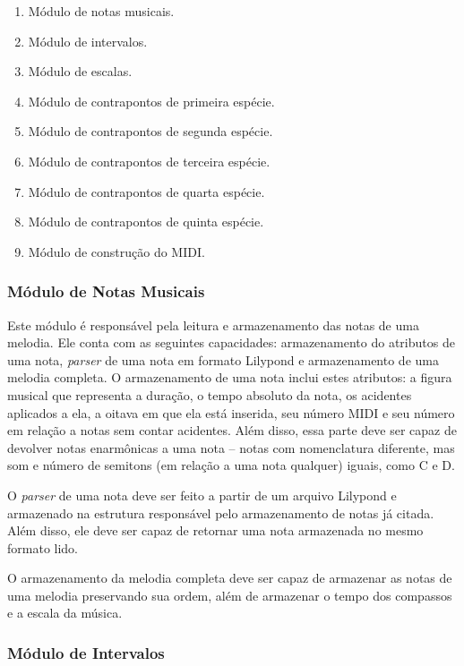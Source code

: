     \begin{enumerate}
      \item Módulo de notas musicais.
      \item Módulo de intervalos.
      \item Módulo de escalas.
      \item Módulo de contrapontos de primeira espécie.
      \item Módulo de contrapontos de segunda espécie.
      \item Módulo de contrapontos de terceira espécie.
      \item Módulo de contrapontos de quarta espécie.
      \item Módulo de contrapontos de quinta espécie.
      \item Módulo de construção do MIDI.
    \end{enumerate}

    \subsubsection[Módulo de Notas Musicais]{Módulo de Notas Musicais}

      Este módulo é responsável pela leitura e armazenamento das notas de uma melodia. Ele conta com as seguintes capacidades: armazenamento do atributos de uma nota, \textit{parser} de uma nota em formato Lilypond e armazenamento de uma melodia completa. O armazenamento de uma nota inclui estes atributos: a figura musical que representa a duração, o tempo absoluto da nota, os acidentes aplicados a ela, a oitava em que ela está inserida, seu número MIDI e seu número em relação a notas sem contar acidentes. Além disso, essa parte deve ser capaz de devolver notas enarmônicas a uma nota -- notas com nomenclatura diferente, mas som e número de semitons (em relação a uma nota qualquer) iguais, como C\sh{}  e D\fl.

      O \textit{parser} de uma nota deve ser feito a partir de um arquivo Lilypond e armazenado na estrutura responsável pelo armazenamento de notas já citada. Além disso, ele deve ser capaz de retornar uma nota armazenada no mesmo formato lido.

      O armazenamento da melodia completa deve ser capaz de armazenar as notas de uma melodia preservando sua ordem, além de armazenar o tempo dos compassos e a escala da música.

    \subsubsection[Módulo de Intervalos]{Módulo de Intervalos}

